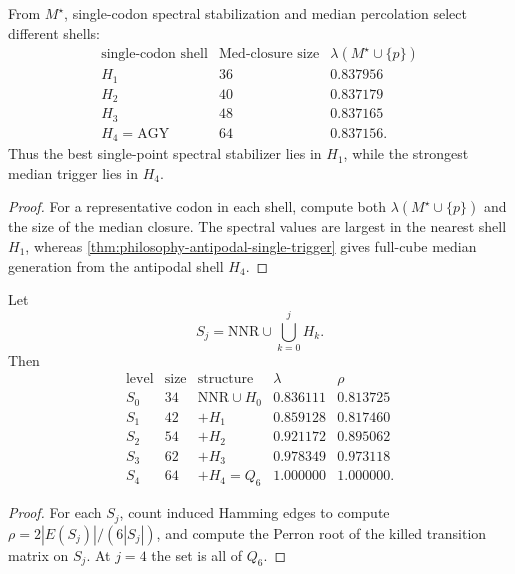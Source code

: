 \begin{theorem}
\label{thm:philosophy-single-point-spectrum-triggering-differ}
From $M^{\star}$, single-codon spectral stabilization and median
percolation select different shells:
$$
\begin{array}{c|r|r}
  \text{single-codon shell} & \operatorname{Med}\text{-closure size}
  & \lambda(M^{\star}\cup\{p\})\\
  \hline
  H_{1} & 36 & 0.837956\\
  H_{2} & 40 & 0.837179\\
  H_{3} & 48 & 0.837165\\
  H_{4}=\mathrm{AGY} & 64 & 0.837156.
\end{array}
$$
Thus the best single-point spectral stabilizer lies in $H_{1}$, while
the strongest median trigger lies in $H_{4}$.
\end{theorem}
\begin{proof}
For a representative codon in each shell, compute both
$\lambda(M^{\star}\cup\{p\})$ and the size of the median closure. The
spectral values are largest in the nearest shell $H_{1}$, whereas
\autoref{thm:philosophy-antipodal-single-trigger} gives full-cube
median generation from the antipodal shell $H_{4}$.
\end{proof}

\begin{theorem}
\label{thm:philosophy-radial-shell-filling-spectrum}
Let
$$
  S_{j}=\mathrm{NNR}\cup\bigcup_{k=0}^{j}H_{k}.
$$
Then
$$
\begin{array}{c|r|l|r|r}
  \text{level} & \text{size} & \text{structure} & \lambda & \rho\\
  \hline
  S_{0} & 34 & \mathrm{NNR}\cup H_{0} & 0.836111 & 0.813725\\
  S_{1} & 42 & +H_{1} & 0.859128 & 0.817460\\
  S_{2} & 54 & +H_{2} & 0.921172 & 0.895062\\
  S_{3} & 62 & +H_{3} & 0.978349 & 0.973118\\
  S_{4} & 64 & +H_{4}=Q_{6} & 1.000000 & 1.000000.
\end{array}
$$
\end{theorem}
\begin{proof}
For each $S_{j}$, count induced Hamming edges to compute
$\rho=2|E(S_{j})|/(6|S_{j}|)$, and compute the Perron root of the
killed transition matrix on $S_{j}$. At $j=4$ the set is all of $Q_{6}$.
\end{proof}

